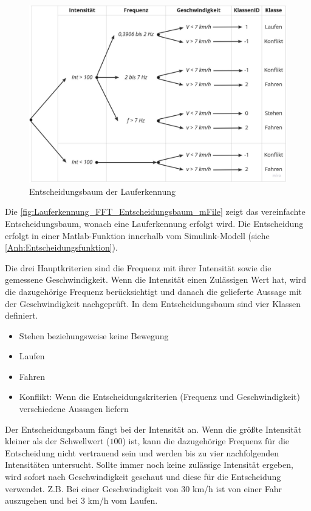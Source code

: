 \begin{figure}[H]
	\centering
	\includegraphics[width=\linewidth]{Bilder/Entscheidungsbaum_mFile.pdf}
	\caption{Entscheidungsbaum der Lauferkennung}
	\label{fig:Lauferkennung_FFT_Entscheidungsbaum_mFile}
\end{figure}

Die \autoref{fig:Lauferkennung_FFT_Entscheidungsbaum_mFile} zeigt das vereinfachte Entscheidungsbaum, wonach eine Lauferkennung erfolgt wird. Die Entscheidung erfolgt in einer Matlab-Funktion innerhalb vom Simulink-Modell (siehe \autoref{Anh:Entscheidungsfunktion}).

Die drei Hauptkriterien sind die Frequenz mit ihrer Intensität sowie die gemessene Geschwindigkeit. Wenn die Intensität einen Zulässigen Wert hat, wird die dazugehörige Frequenz berücksichtigt und danach die gelieferte Aussage mit der Geschwindigkeit nachgeprüft.
In dem Entscheidungsbaum sind vier Klassen definiert.
\begin{itemize}
	\item Stehen beziehungsweise keine Bewegung
	\item Laufen
	\item Fahren
	\item Konflikt: Wenn die Entscheidungskriterien (Frequenz und Geschwindigkeit) verschiedene Aussagen liefern
\end{itemize}
Der Entscheidungsbaum fängt bei der Intensität an. Wenn die größte Intensität kleiner als der Schwellwert ($100$) ist, kann die dazugehörige Frequenz für die Entscheidung nicht vertrauend sein und werden bis zu vier nachfolgenden Intensitäten untersucht. Sollte immer noch keine zulässige Intensität ergeben, wird sofort nach Geschwindigkeit geschaut und diese für die Entscheidung verwendet.
Z.B. Bei einer Geschwindigkeit von $30$ km/h ist von einer Fahr auszugehen und bei $3$ km/h vom Laufen.

